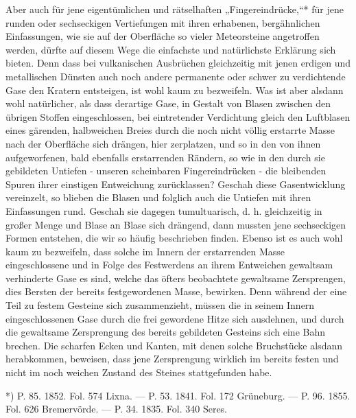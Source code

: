 \documentclass[a4paper, 8pt, oneside, polutonikogreek, german]{article}
\begin{document}
Aber auch für jene eigentümlichen und rätselhaften „Fingereindrücke,“* für jene runden oder sechseckigen Vertiefungen mit ihren erhabenen, bergähnlichen Einfassungen, wie sie auf der Oberfläche so vieler Meteorsteine angetroffen werden, dürfte auf diesem Wege die einfachste und natürlichste Erklärung sich bieten. Denn dass bei vulkanischen Ausbrüchen gleichzeitig mit jenen erdigen und metallischen Dünsten auch noch andere permanente oder schwer zu verdichtende Gase den Kratern entsteigen, ist wohl kaum zu bezweifeln. Was ist aber alsdann wohl natürlicher, als dass derartige Gase, in Gestalt von Blasen zwischen den übrigen Stoffen eingeschlossen, bei eintretender Verdichtung gleich den Luftblasen eines gärenden, halbweichen Breies durch die noch nicht völlig erstarrte Masse nach der Oberfläche sich drängen, hier zerplatzen, und so in den von ihnen aufgeworfenen, bald ebenfalls erstarrenden Rändern, so wie in den durch sie gebildeten Untiefen - unseren scheinbaren Fingereindrücken - die bleibenden Spuren ihrer einstigen Entweichung zurücklassen? Geschah diese Gasentwicklung vereinzelt, so blieben die Blasen und folglich auch die Untiefen mit ihren Einfassungen rund. Geschah sie dagegen tumultuarisch, d. h. gleichzeitig in großer Menge und Blase an Blase sich drängend, dann mussten jene sechseckigen Formen entstehen, die wir so häufig beschrieben finden. Ebenso ist es auch wohl kaum zu bezweifeln, dass solche im Innern der erstarrenden Masse eingeschlossene und in Folge des Festwerdens an ihrem Entweichen gewaltsam verhinderte Gase es sind, welche das öfters beobachtete gewaltsame Zersprengen, dies Bersten der bereits festgewordenen Masse, bewirken. Denn während der eine Teil zu festem Gesteine sich zusammenzieht, müssen die in seinem Innern eingeschlossenen Gase durch die frei gewordene Hitze sich ausdehnen, und durch die gewaltsame Zersprengung des bereits gebildeten Gesteins sich eine Bahn brechen. Die scharfen Ecken und Kanten, mit denen solche Bruchstücke alsdann herabkommen, beweisen, dass jene Zersprengung wirklich im bereits festen und nicht im noch weichen Zustand des Steines stattgefunden habe.

*) P. 85. 1852. Fol. 574 Lixna. — P. 53. 1841. Fol. 172 Grüneburg. — P. 96. 1855. Fol. 626 Bremervörde. — P. 34. 1835. Fol. 340 Seres.
\end{document}
